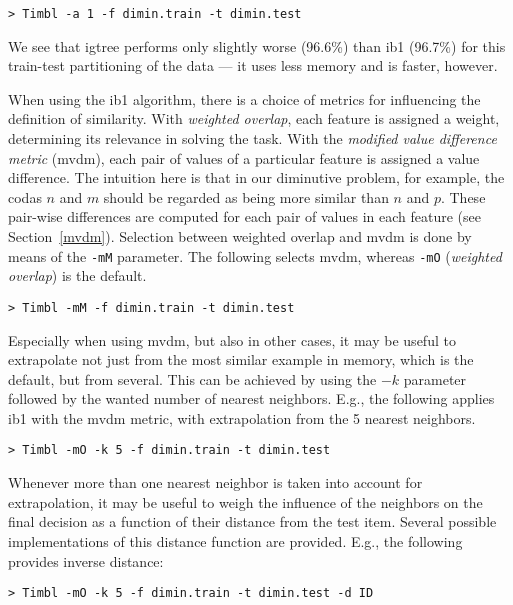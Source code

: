 \documentclass{report}
\begin{document}
{\footnotesize
\begin{verbatim}
> Timbl -a 1 -f dimin.train -t dimin.test
\end{verbatim}} 

We see that {\sc igtree} performs only slightly worse (96.6\%) than
{\sc ib1} (96.7\%) for this train-test partitioning of the data --- it
uses less memory and is faster, however.

When using the {\sc ib1} algorithm, there is a choice of metrics for
influencing the definition of similarity. With {\em weighted overlap},
each feature is assigned a weight, determining its relevance in
solving the task. With the {\em modified value difference metric}
({\sc mvdm}), each pair of values of a particular feature is assigned
a value difference. The intuition here is that in our diminutive
problem, for example, the codas $n$ and $m$ should be regarded as
being more similar than $n$ and $p$. These pair-wise differences are
computed for each pair of values in each feature (see
Section~\ref{mvdm}). Selection between weighted overlap and {\sc mvdm}
is done by means of the {\tt -mM} parameter. The following selects {\sc
mvdm}, whereas {\tt -mO} ({\em weighted overlap}) is the default.

{\footnotesize
\begin{verbatim}
> Timbl -mM -f dimin.train -t dimin.test
\end{verbatim}
}

Especially when using {\sc mvdm}, but also in other cases, it may be
useful to extrapolate not just from the most similar example in
memory, which is the default, but from several. This can be achieved
by using the $-k$ parameter followed by the wanted number of nearest
neighbors. E.g., the following applies {\sc ib1} with the {\sc mvdm}
metric, with extrapolation from the 5 nearest neighbors.

{\footnotesize
\begin{verbatim}
> Timbl -mO -k 5 -f dimin.train -t dimin.test
\end{verbatim}
}

Whenever more than one nearest neighbor is taken into account for
extrapolation, it may be useful to weigh the influence of the
neighbors on the final decision as a function of their distance from
the test item. Several possible implementations of this distance
function are provided. E.g., the following provides inverse distance: 

{\footnotesize
\begin{verbatim}
> Timbl -mO -k 5 -f dimin.train -t dimin.test -d ID
\end{verbatim}
}
\end{document}
